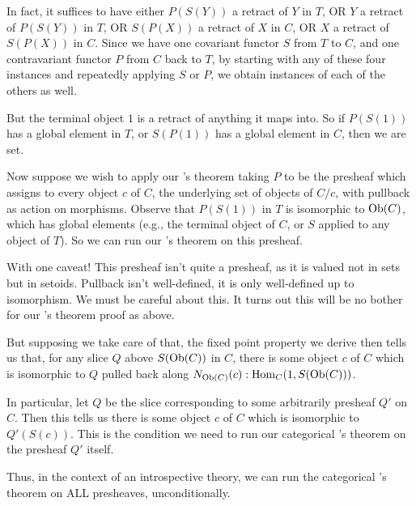 In fact, it suffices to have either $P(S(Y))$ a retract of $Y$ in $T$, OR $Y$ a retract of $P(S(Y))$ in $T$, OR $S(P(X))$ a retract of $X$ in $C$, OR $X$ a retract of $S(P(X))$ in $C$. Since we have one covariant functor $S$ from $T$ to $C$, and one contravariant functor $P$ from $C$ back to $T$, by starting with any of these four instances and repeatedly applying $S$ or $P$, we obtain instances of each of the others as well.   

But the terminal object $1$ is a retract of anything it maps into. So if $P(S(1))$ has a global element in $T$, or $S(P(1))$ has a global element in $C$, then we are set.

Now suppose we wish to apply our \Loeb's theorem taking $P$ to be the presheaf which assigns to every object $c$ of $C$, the underlying set of objects of $C/c$, with pullback as action on morphisms. Observe that $P(S(1))$ in $T$ is isomorphic to $\operatorname{Ob}(C)$, which has global elements (e.g., the terminal object of $C$, or $S$ applied to any object of $T$). So we can run our \Loeb's theorem on this presheaf.

With one caveat! This presheaf isn't quite a presheaf, as it is valued not in sets but in setoids. Pullback isn't well-defined, it is only well-defined up to isomorphism. We must be careful about this. It turns out this will be no bother for our \Loeb's theorem proof as above. 

But supposing we take care of that, the fixed point property we derive then tells us that, for any slice $Q$ above $S(\operatorname{Ob}(C))$ in $C$, there is some object $c$ of $C$ which is isomorphic to $Q$ pulled back along $N_{\operatorname{Ob}(C)}(c) : \operatorname{Hom}_C(1, S(\operatorname{Ob}(C)))$.

In particular, let $Q$ be the slice corresponding to some arbitrarily presheaf $Q'$ on $C$. Then this tells us there is some object $c$ of $C$ which is isomorphic to $Q'(S(c))$. This is the condition we need to run our categorical \Loeb's theorem on the presheaf $Q'$ itself.

Thus, in the context of an introspective theory, we can run the categorical \Loeb's theorem on ALL presheaves, unconditionally.

